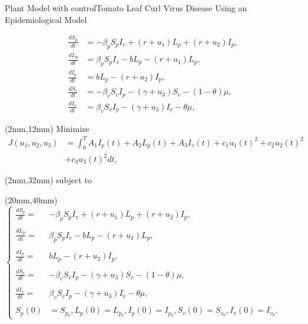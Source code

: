 	\begin{frame}{Plant Model with control}{Tomato Leaf Curl Virus Disease Using an Epidemiological Model}
		
		\begin{align*}
		\frac{dS_p}{dt} &=-\beta_p S_p I_v +(r +u_1)L_p + (r + u_2) I_p,\\
		\frac{dL_p}{dt} &=\beta_p S_p I_v -b L_p -(r + u_1)L_p,\\
		\frac{dI_p}{dt} &= b L_p - (r + u_2) I_p,\\
		\frac{dS_v}{dt} &=-\beta_v S_v I_p - (\gamma+u_3) S_v -(1-\theta)\mu,\\
		\frac{dI_v}{dt} &=\beta_v S_v I_p -(\gamma+u_3) I_v -\theta\mu,				
		\end{align*}
	\end{frame}
	\begin{frame}
		\begin{textblock*}{120mm}(2mm,12mm)
			Minimize
			\begin{align*}
			J(u_1,u_2,u_3)&=\int_{0}^T	A_1 I_p(t) + A_2 L_p(t) + A_3 I_v(t)
			+ c_1 u_1(t)^2+ c_2 u_2(t)^2\\ &+ c_3 u_3(t)^2 dt,
			\end{align*}
		\end{textblock*}
		\begin{textblock*}{20mm}(2mm,32mm)
			subject to
		\end{textblock*}
		
		\begin{textblock*}{120mm}(20mm,40mm)
			\hspace{50mm}	$\left\{ \begin{array}{ll}
			\frac{dS_p}{dt} = &-\beta_p S_p I_v +(r +u_1)L_p + (r + u_2) I_p,\\\\
			\frac{dL_p}{dt} =&\beta_p S_p I_v -b L_p -(r + u_1)L_p,\\\\
			\frac{dI_p}{dt} =& b L_p - (r + u_2) I_p,\\\\
			\frac{dS_v}{dt} =&-\beta_v S_v I_p - (\gamma+u_3) S_v -(1-\theta)\mu,\\\\
			\frac{dI_v}{dt} =&\beta_v S_v I_p -(\gamma+u_3) I_v -\theta\mu,\\\\
			S_p(0) &= S_{p_0}, L_p(0) = L_{p_0},I_p(0) = I_{p_0},S_v(0) = S_{v_0}, I_v(0) = I_{v_0}.			
			\end{array}\right.$
		\end{textblock*}
	\end{frame}
